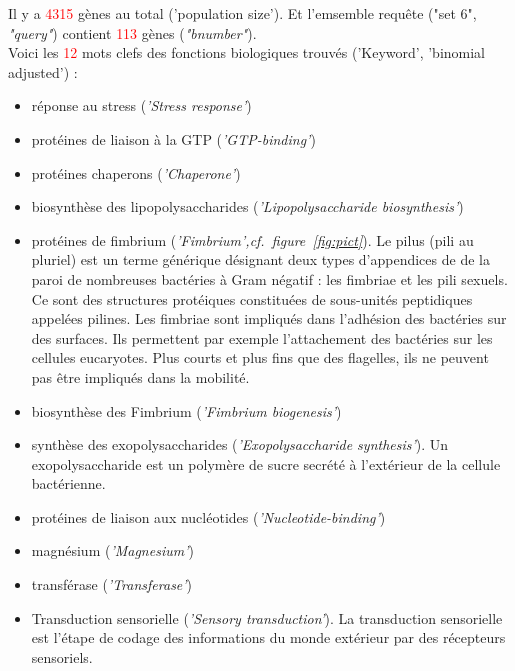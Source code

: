 \documentclass[a4paper,11pt,openright]{report}
\begin{document}

Il y a \textcolor{red}{4315} gènes au total ('population size'). Et l'emsemble requête ("set 6", \textit{"query"}) contient \textcolor{red}{113} gènes (\textit{"bnumber"}). \\
Voici les \textcolor{red}{12} mots clefs des fonctions biologiques trouvés ('Keyword', 'binomial adjusted') : 
\begin{itemize}[label=\textbullet]
	\item réponse au stress (\textit{'Stress response'}) 
	\item protéines de liaison à la GTP (\textit{'GTP-binding'})
	\item protéines chaperons (\textit{'Chaperone'})
	\item biosynthèse des lipopolysaccharides (\textit{'Lipopolysaccharide biosynthesis'})
	\item protéines de fimbrium (\textit{'Fimbrium',cf.~figure~\ref{fig:pict}}). Le pilus (pili au pluriel) est un terme générique désignant deux types d'appendices de de la paroi de nombreuses bactéries à Gram négatif : les fimbriae et les pili sexuels. Ce sont des structures protéiques constituées de sous-unités peptidiques appelées pilines. Les fimbriae sont impliqués dans l'adhésion des bactéries sur des surfaces. Ils permettent par exemple l'attachement des bactéries sur les cellules eucaryotes.  Plus courts et plus fins que des flagelles, ils ne peuvent pas être impliqués dans la mobilité.
	\item biosynthèse des Fimbrium (\textit{'Fimbrium biogenesis'})
	\item synthèse des exopolysaccharides (\textit{'Exopolysaccharide synthesis'}). Un exopolysaccharide est un polymère de sucre secrété à l'extérieur de la cellule bactérienne.
	\item protéines de liaison aux nucléotides (\textit{'Nucleotide-binding'})
	\item magnésium (\textit{'Magnesium'})
	\item transférase (\textit{'Transferase'})
	\item Transduction sensorielle (\textit{'Sensory transduction'}). La transduction sensorielle est l'étape de codage des informations du monde extérieur par des récepteurs sensoriels. 
	\end{itemize}
\end{document}
